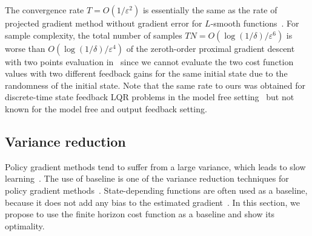 The convergence rate $T = O(1/\varepsilon^2)$ is essentially the same as the rate of projected gradient method without gradient error for $L$-smooth functions~\cite{beck2017first}. For sample complexity, the total number of samples $TN = O(\log(1/\delta)/\varepsilon^6)$ is worse than $O(\log(1/\delta)/\varepsilon^4)$ of the zeroth-order proximal gradient descent with two points evaluation in~\cite{ghadimi_mini-batch_2016} since we cannot evaluate the two cost function values with two different feedback gains for the same initial state due to the randomness of the initial state. Note that the same rate to ours was obtained for discrete-time state feedback LQR problems in the model free setting~\cite{hambly2021policy} but not known for the model free and output feedback setting.

\subsection{Variance reduction}
Policy gradient methods tend to suffer from a large variance, which leads to slow learning~\cite{grondman2012survey}.
The use of baseline is one of the variance reduction techniques for policy gradient methods~\cite{grondman2012survey}.
State-depending functions are often used as a baseline, because it does not add any bias to the estimated gradient~\cite{degris2012model-free, mnih2016asynchronous}.
In this section, we propose to use the finite horizon cost function as a baseline and show its optimality.

